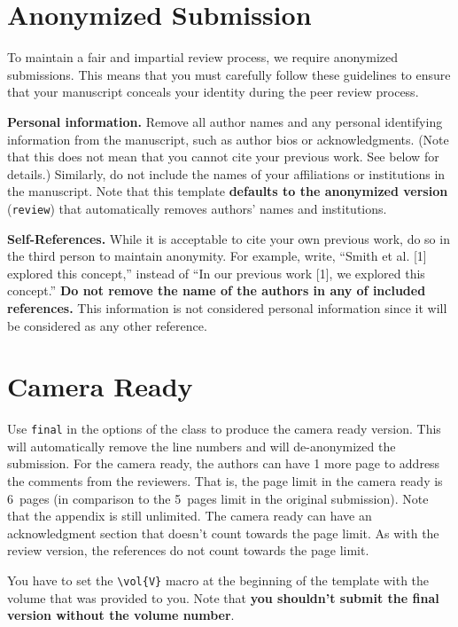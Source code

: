 \documentclass[fullpaper]{nldl}
\begin{document}
\section{Anonymized Submission}
\label{sec:anon}

To maintain a fair and impartial review process, we require anonymized submissions.
This means that you must carefully follow these guidelines to ensure that your manuscript conceals your identity during the peer review process.

\textbf{Personal information.}
Remove all author names and any personal identifying information from the manuscript, such as author bios or acknowledgments.
(Note that this does not mean that you cannot cite your previous work.
See below for details.)
Similarly, do not include the names of your affiliations or institutions in the manuscript.
Note that this template \textbf{defaults to the anonymized version} (\verb|review|) that automatically removes authors' names and institutions.

\textbf{Self-References.}
While it is acceptable to cite your own previous work, do so in the third person to maintain anonymity.
For example, write, ``Smith et al. [1] explored this concept,'' instead of ``In our previous work [1], we explored this concept.''
\textbf{Do not remove the name of the authors in any of included references.}
This information is not considered personal information since it will be considered as any other reference.

\section{Camera Ready}

Use \verb|final| in the options of the class to produce the camera ready version.
This will automatically remove the line numbers and will de-anonymized the submission.
For the camera ready, the authors can have 1 more page to address the comments from the reviewers.
That is, the page limit in the camera ready is 6~pages (in comparison to the 5~pages limit in the original submission).
Note that the appendix is still unlimited.
The camera ready can have an acknowledgment section that doesn't count towards the page limit.
As with the review version, the references do not count towards the page limit.

You have to set the \verb|\vol{V}| macro at the beginning of the template with the volume that was provided to you.
Note that \textbf{you shouldn't submit the final version without the volume number}.
\end{document}
